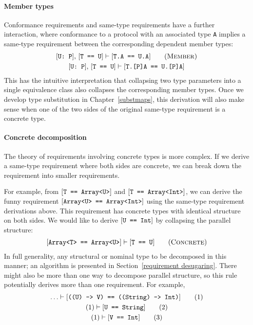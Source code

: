\documentclass[../generics]{subfiles}
\begin{document}
\paragraph{Member types}
 Conformance requirements and same-type requirements have a further interaction, where conformance to a protocol with an associated type \texttt{A} implies a same-type requirement between the corresponding dependent member types:
\begin{gather*}
\ConfReq{U}{P},\,\FormalReq{T == U}\vdash\FormalReq{T.A == U.A}\tag{\textsc{Member}}\\
\ConfReq{U}{P},\,\FormalReq{T == U}\vdash\FormalReq{T.[P]A == U.[P]A}
\end{gather*}
This has the intuitive interpretation that collapsing two type parameters into a single equivalence class also collapses the corresponding member types. Once we develop type substitution in Chapter~\ref{substmaps}, this derivation will also make sense when one of the two sides of the original same-type requirement is a concrete type.

\paragraph{Concrete decomposition}
 The theory of requirements involving concrete types is more complex. If we derive a same-type requirement where both sides are concrete, we can break down the requirement into smaller requirements.

For example, from $[\texttt{T == Array<U>}]$ and $[\texttt{T == Array<Int>}]$, we can derive the funny requirement $[\texttt{Array<U> == Array<Int>}]$ using the same-type requirement derivations above. This requirement has concrete types with identical structure on both sides. We would like to derive $[\texttt{U == Int}]$ by collapsing the parallel structure:
\begin{gather*}
\FormalReq{Array<T> == Array<U>}\vdash\FormalReq{T == U}\tag{\textsc{Concrete}}
\end{gather*}
In full generality, any structural or nominal type to be decomposed in this manner; an algorithm is presented in Section~\ref{requirement desugaring}. There might also be more than one way to decompose parallel structure, so this rule potentially derives more than one requirement. For example,
\begin{gather}
\ldots\vdash[\texttt{((U) -> V) == ((String) -> Int)}]\tag{1}\\
(1)\vdash[\texttt{U == String}]\tag{2}\\
(1)\vdash[\texttt{V == Int}]\tag{3}
\end{gather}
\end{document}
